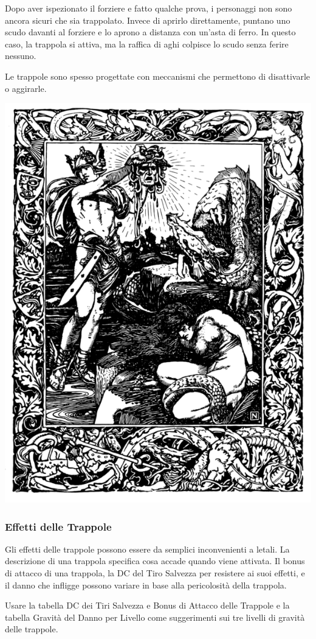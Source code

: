 \begin{multicols}{2}
Dopo aver ispezionato il forziere e fatto qualche prova, i personaggi non sono ancora sicuri che sia trappolato. Invece di aprirlo direttamente, puntano uno scudo davanti al forziere e lo aprono a distanza con un'asta di ferro. In questo caso, la trappola si attiva, ma la raffica di aghi colpisce lo scudo senza ferire nessuno.

Le trappole sono spesso progettate con meccanismi che permettono di disattivarle o aggirarle.


\medskip

\begin{center}
\includegraphics[width=0.7\linewidth]{immagini/medusa.png}
\end{center}

\subsubsection{Effetti delle Trappole}
Gli effetti delle trappole possono essere da semplici inconvenienti a letali. La descrizione di una trappola specifica cosa accade quando viene attivata.
Il bonus di attacco di una trappola, la DC del Tiro Salvezza per resistere ai suoi effetti, e il danno che infligge possono variare in base alla pericolosità della trappola.

Usare la tabella DC dei Tiri Salvezza e Bonus di Attacco delle Trappole e la tabella Gravità del Danno per Livello come suggerimenti sui tre livelli di gravità delle trappole.


\end{multicols}

